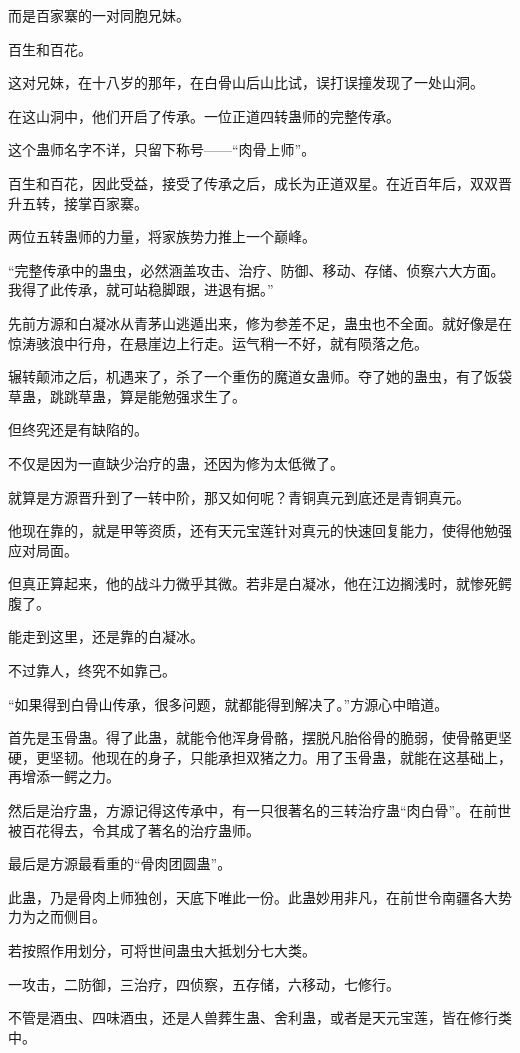 \begin{this_body}
而是百家寨的一对同胞兄妹。

百生和百花。

这对兄妹，在十八岁的那年，在白骨山后山比试，误打误撞发现了一处山洞。

在这山洞中，他们开启了传承。一位正道四转蛊师的完整传承。

这个蛊师名字不详，只留下称号——“肉骨上师”。

百生和百花，因此受益，接受了传承之后，成长为正道双星。在近百年后，双双晋升五转，接掌百家寨。

两位五转蛊师的力量，将家族势力推上一个巅峰。

“完整传承中的蛊虫，必然涵盖攻击、治疗、防御、移动、存储、侦察六大方面。我得了此传承，就可站稳脚跟，进退有据。”

先前方源和白凝冰从青茅山逃遁出来，修为参差不足，蛊虫也不全面。就好像是在惊涛骇浪中行舟，在悬崖边上行走。运气稍一不好，就有陨落之危。

辗转颠沛之后，机遇来了，杀了一个重伤的魔道女蛊师。夺了她的蛊虫，有了饭袋草蛊，跳跳草蛊，算是能勉强求生了。

但终究还是有缺陷的。

不仅是因为一直缺少治疗的蛊，还因为修为太低微了。

就算是方源晋升到了一转中阶，那又如何呢？青铜真元到底还是青铜真元。

他现在靠的，就是甲等资质，还有天元宝莲针对真元的快速回复能力，使得他勉强应对局面。

但真正算起来，他的战斗力微乎其微。若非是白凝冰，他在江边搁浅时，就惨死鳄腹了。

能走到这里，还是靠的白凝冰。

不过靠人，终究不如靠己。

“如果得到白骨山传承，很多问题，就都能得到解决了。”方源心中暗道。

首先是玉骨蛊。得了此蛊，就能令他浑身骨骼，摆脱凡胎俗骨的脆弱，使骨骼更坚硬，更坚韧。他现在的身子，只能承担双猪之力。用了玉骨蛊，就能在这基础上，再增添一鳄之力。

然后是治疗蛊，方源记得这传承中，有一只很著名的三转治疗蛊“肉白骨”。在前世被百花得去，令其成了著名的治疗蛊师。

最后是方源最看重的“骨肉团圆蛊”。

此蛊，乃是骨肉上师独创，天底下唯此一份。此蛊妙用非凡，在前世令南疆各大势力为之而侧目。

若按照作用划分，可将世间蛊虫大抵划分七大类。

一攻击，二防御，三治疗，四侦察，五存储，六移动，七修行。

不管是酒虫、四味酒虫，还是人兽葬生蛊、舍利蛊，或者是天元宝莲，皆在修行类中。


\end{this_body}
